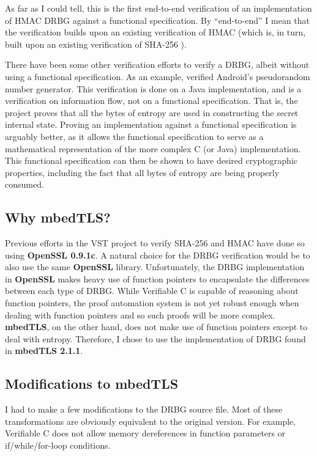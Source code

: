 \documentclass[pageno]{jpaper}
\newcommand{\stdtitle}[1]{\textbf{#1}}
\begin{document}
As far as I could tell, this is the first end-to-end verification of an implementation of HMAC DRBG against a functional specification. By “end-to-end” I mean that the verification builds upon an existing verification of HMAC \cite{hmac} (which is, in turn, built upon an existing verification of SHA-256 \cite{sha}).

There have been some other verification efforts to verify a DRBG, albeit without using a functional specification. As an example, \cite{prng} verified Android’s pseudorandom number generator. This verification is done on a Java implementation, and is a verification on information flow, not on a functional specification. That is, the project proves that all the bytes of entropy are used in constructing the secret internal state. Proving an implementation against a functional specification is arguably better, as it allows the functional specification to serve as a mathematical representation of the more complex C (or Java) implementation. This functional specification can then be shown to have desired cryptographic properties, including the fact that all bytes of entropy are being properly consumed.


\subsection{Why mbedTLS?}

Previous efforts in the VST project to verify SHA-256 \cite{sha} and HMAC \cite{hmac} have done so using \stdtitle{OpenSSL 0.9.1c}. A natural choice for the DRBG verification would be to also use the same \stdtitle{OpenSSL} library. Unfortunately, the DRBG implementation in \stdtitle{OpenSSL} makes heavy use of function pointers to encapsulate the differences between each type of DRBG. While Verifiable C is capable of reasoning about function pointers, the proof automation system is not yet robust enough when dealing with function pointers and so such proofs will be more complex. \stdtitle{mbedTLS}, on the other hand, does not make use of function pointers except to deal with entropy. Therefore, I chose to use the implementation of DRBG found in \stdtitle{mbedTLS 2.1.1}.

\subsection{Modifications to mbedTLS}
I had to make a few modifications to the  DRBG source file. Most of these transformations are obviously equivalent to the original version. For example, Verifiable C does not allow memory dereferences in function parameters or if/while/for-loop conditions.
\end{document}
